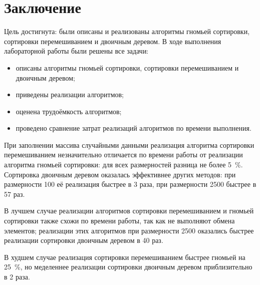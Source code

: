 \chapter*{Заключение}

Цель достигнута: были описаны и реализованы алгоритмы гномьей сортировки, сортировки перемешиванием и двоичным деревом. В ходе выполнения лабораторной работы были решены все задачи:
\begin{itemize}
	\item описаны алгоритмы гномьей сортировки, сортировки перемешиванием и двоичным деревом;
	\item приведены реализации алгоритмов;
	\item оценена трудоёмкость алгоритмов;
	\item проведено сравнение затрат реализаций алгоритмов по времени выполнения.
\end{itemize}

При заполнении массива случайными данными реализация алгоритма сортировки перемешиванием незначительно отличается по времени работы от реализации алгоритма гномьей сортировки: для всех размерностей разница не более 5~\%. Сортировка двоичным деревом  оказалась эффективнее других методов: при размерности 100 её реализация быстрее в 3 раза, при размерности 2500 быстрее в 57 раз.

В лучшем случае реализации алгоритмов сортировки перемешиванием и гномьей сортировки также схожи по времени работы, так как не выполняют обмена элементов; реализации этих алгоритмов при размерности 2500 оказались быстрее реализации сортировки двоичным деревом в 40 раз.

В худшем случае реализация сортировки перемешиванием быстрее гномьей на 25~\%, но меделеннее реализации сортировки двоичным деревом приблизительно в 2 раза.


